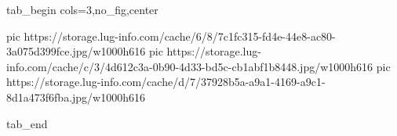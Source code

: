  
 
 
 
 


\ifcmt
  tab_begin cols=3,no_fig,center

     pic https://storage.lug-info.com/cache/6/8/7c1fc315-fd4e-44e8-ac80-3a075d399fce.jpg/w1000h616
		 pic https://storage.lug-info.com/cache/c/3/4d612c3a-0b90-4d33-bd5c-cb1abf1b8448.jpg/w1000h616
		 pic https://storage.lug-info.com/cache/d/7/37928b5a-a9a1-4169-a9c1-8d1a473f6fba.jpg/w1000h616

  tab_end
\fi
